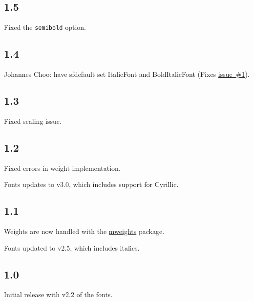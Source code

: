 \documentclass[10pt,a4paper,english]{article}
\begin{document}
\begin{multicols}{2}
\subsection*{1.5}
\begin{itemize*}
\item Fixed the \texttt{semibold} option.
\end{itemize*}

\subsection*{1.4}
\begin{itemize*}
	\item Johannes Choo: have sfdefault set ItalicFont and BoldItalicFont (Fixes \href{https://github.com/silkeh/latex-raleway/issues/1}{issue~\#1}).
\end{itemize*}

\subsection*{1.3}
\begin{itemize*}
	\item Fixed scaling issue.
\end{itemize*}

\subsection*{1.2}
\begin{itemize*}
	\item Fixed errors in weight implementation.
	\item Fonts updates to v3.0, which includes support for Cyrillic.
\end{itemize*}

\subsection*{1.1}
\begin{itemize*}
	\item Weights are now handled with the \href{http://www.ctan.org/pkg/mweights}{mweights} package.
	\item Fonts updated to v2.5, which includes italics.
\end{itemize*}

\subsection*{1.0}
\begin{itemize*}
	\item Initial release with v2.2 of the fonts.
\end{itemize*}


\vspace{0pt plus 1filll}\mbox{}
\newpage
\end{multicols}
\end{document}
